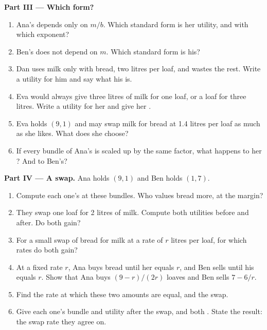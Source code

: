 \begin{problem}
\medskip\noindent\textbf{Part III --- Which form?}
\begin{enumerate}[resume]
  \item Ana's  depends only on $m/b$. Which standard form is her utility, and with which exponent?
  \item Ben's  does not depend on $m$. Which standard form is his?
  \item Dan uses milk only with bread, two litres per loaf, and wastes the rest. Write a utility for him and say what his  is.
  \item Eva would always give three litres of milk for one loaf, or a loaf for three litres. Write a utility for her and give her .
  \item Eva holds $(9, 1)$ and may swap milk for bread at 1.4 litres per loaf as much as she likes. What does she choose?
  \item If every bundle of Ana's is scaled up by the same factor, what happens to her ? And to Ben's?
\end{enumerate}

\medskip\noindent\textbf{Part IV --- A swap.}
Ana holds $(9, 1)$ and Ben holds $(1, 7)$.
\begin{enumerate}[resume]
  \item Compute each one's  at these bundles. Who values bread more, at the margin?
  \item They swap one loaf for 2 litres of milk. Compute both utilities before and after. Do both gain?
  \item For a small swap of bread for milk at a rate of $r$ litres per loaf, for which rates do both gain?
  \item At a fixed rate $r$, Ana buys bread until her  equals $r$, and Ben sells until his equals $r$. Show that Ana buys $(9 - r)/(2r)$ loaves and Ben sells $7 - 6/r$.
  \item Find the rate at which these two amounts are equal, and the swap.
  \item Give each one's bundle and utility after the swap, and both . State the result: the swap rate they agree on.
\end{enumerate}
\end{problem}
